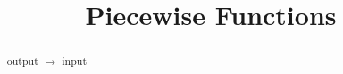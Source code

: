\documentclass{ximera}
\title{Piecewise Functions}
\begin{document}
\begin{abstract}
output $\rightarrow$ input
\end{abstract}
\maketitle
\end{document}
